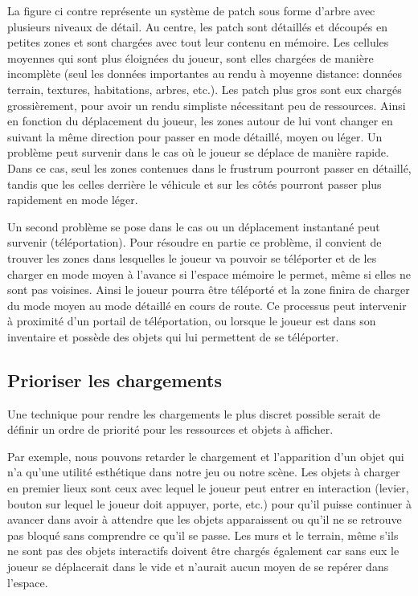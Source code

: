 \documentclass[a4paper, 11pt]{article} %
\begin{document}
La figure ci contre représente un système de patch sous forme d'arbre avec plusieurs niveaux de détail. Au centre, les patch sont détaillés et découpés en petites zones et sont chargées avec tout leur contenu en mémoire. Les cellules moyennes qui sont plus éloignées du joueur, sont elles chargées de manière incomplète (seul les données importantes au rendu à moyenne distance: données terrain, textures, habitations, arbres, etc.). Les patch plus gros sont eux chargés grossièrement, pour avoir un rendu simpliste nécessitant peu de ressources. Ainsi en fonction du déplacement du joueur, les zones autour de lui vont changer en suivant la même direction pour passer en mode détaillé, moyen ou léger. Un problème peut survenir dans le cas où le joueur se déplace de manière rapide. Dans ce cas, seul les zones contenues dans le frustrum pourront passer en détaillé, tandis que les celles derrière le véhicule et sur les côtés pourront passer plus rapidement en mode léger.

Un second problème se pose dans le cas ou un déplacement instantané peut survenir (téléportation). Pour résoudre en partie ce problème, il convient de trouver les zones dans lesquelles le joueur va pouvoir se téléporter et de les charger en mode moyen à l'avance si l'espace mémoire le permet, même si elles ne sont pas voisines. Ainsi le joueur pourra être téléporté et la zone finira de charger du mode moyen au mode détaillé en cours de route. Ce processus peut intervenir à proximité d'un portail de téléportation, ou lorsque le joueur est dans son inventaire et possède des objets qui lui permettent de se téléporter.

\newpage
\subsection{Prioriser les chargements}
Une technique pour rendre les chargements le plus discret possible serait de définir un ordre de priorité pour les ressources et objets à afficher. 

Par exemple, nous pouvons retarder le chargement et l'apparition d'un objet qui n'a qu'une utilité esthétique dans notre jeu ou notre scène. Les objets à charger en premier lieux sont ceux avec lequel le joueur peut entrer en interaction (levier, bouton sur lequel le joueur doit appuyer, porte, etc.) pour qu'il puisse continuer à avancer dans avoir à attendre que les objets apparaissent ou qu'il ne se retrouve pas bloqué sans comprendre ce qu'il se passe. Les murs et le terrain, même s'ils ne sont pas des objets interactifs doivent être chargés également car sans eux le joueur se déplacerait dans le vide et n'aurait aucun moyen de se repérer dans l'espace.
\end{document}
